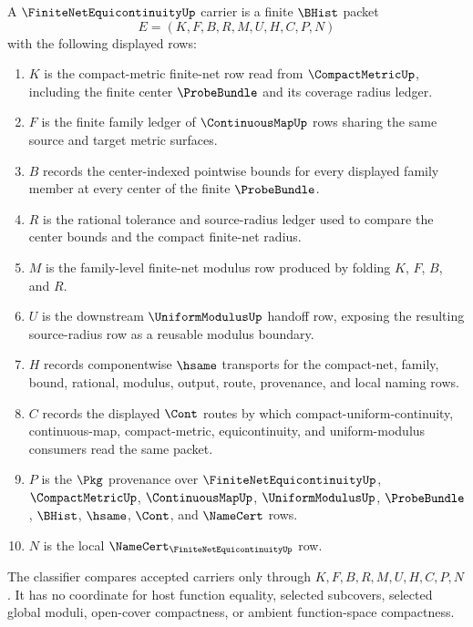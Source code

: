 \begin{definition}
\label{def:finite-net-equicontinuity-carrier}
A $\FiniteNetEquicontinuityUp$ carrier is a finite $\BHist$ packet
$$
E=(K,F,B,R,M,U,H,C,P,N)
$$
with the following displayed rows:
\begin{enumerate}
\item $K$ is the compact-metric finite-net row read from $\CompactMetricUp$, including the finite center $\ProbeBundle$ and its coverage radius ledger.
\item $F$ is the finite family ledger of $\ContinuousMapUp$ rows sharing the same source and target metric surfaces.
\item $B$ records the center-indexed pointwise bounds for every displayed family member at every center of the finite $\ProbeBundle$.
\item $R$ is the rational tolerance and source-radius ledger used to compare the center bounds and the compact finite-net radius.
\item $M$ is the family-level finite-net modulus row produced by folding $K$, $F$, $B$, and $R$.
\item $U$ is the downstream $\UniformModulusUp$ handoff row, exposing the resulting source-radius row as a reusable modulus boundary.
\item $H$ records componentwise $\hsame$ transports for the compact-net, family, bound, rational, modulus, output, route, provenance, and local naming rows.
\item $C$ records the displayed $\Cont$ routes by which compact-uniform-continuity, continuous-map, compact-metric, equicontinuity, and uniform-modulus consumers read the same packet.
\item $P$ is the $\Pkg$ provenance over $\FiniteNetEquicontinuityUp$, $\CompactMetricUp$, $\ContinuousMapUp$, $\UniformModulusUp$, $\ProbeBundle$, $\BHist$, $\hsame$, $\Cont$, and $\NameCert$ rows.
\item $N$ is the local $\NameCert_{\FiniteNetEquicontinuityUp}$ row.
\end{enumerate}
The classifier compares accepted carriers only through $K,F,B,R,M,U,H,C,P,N$. It has no coordinate for host function equality, selected subcovers, selected global moduli, open-cover compactness, or ambient function-space compactness.
\end{definition}


